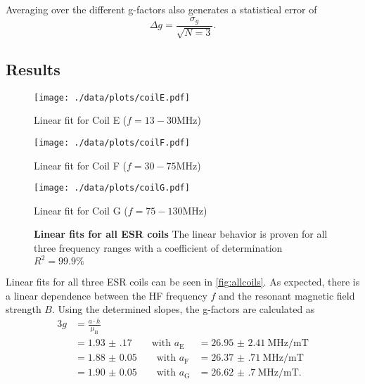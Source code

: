 Averaging over the different g-factors also generates a statistical error of
\begin{equation*}
	\Delta g = \frac{\sigma_g}{\sqrt{N=3}}.
\end{equation*}

\subsection{Results}
\begin{figure}[!htb]
		\texttt{[image: ./data/plots/coilE.pdf]}
		\caption*{Linear fit for Coil E ($f=13-30\si{\MHz}$)}\label{fig:coilE}
	\endminipage\hfill
	\texttt{[image: ./data/plots/coilF.pdf]}
	\caption*{Linear fit for Coil F ($f=30-75\si{\MHz}$)}\label{fig:coilF}
	\endminipage\hfill\centering
	\texttt{[image: ./data/plots/coilG.pdf]}
	\caption*{Linear fit for Coil G ($f=75-130\si{\MHz}$)}\label{fig:coilG}
	\endminipage
	\caption[Linear fits for all ESR coils]{\textbf{Linear fits for all ESR coils} The linear behavior is proven for all three frequency ranges with a coefficient of determination $R^2=\num{99.9}\%$}
	\label{fig:allcoils}
\end{figure}

Linear fits for all three ESR coils can be seen in \autoref{fig:allcoils}.
As expected, there is a linear dependence between the HF frequency $f$ and the resonant magnetic field strength $B$.
Using the determined slopes, the g-factors are calculated as
\begin{alignat*}{3}
	g &= \frac{a\cdot h}{\mu_\text{B}} \\
	&= \num{1.93(17)}\qquad\text{with } a_\text{E}&=\SI{26.95(241)}{\MHz\per\milli\tesla} \\
	&= \num{1.88(5)}\qquad\text{with } a_\text{F}&=\SI{26.37(71)}{\MHz\per\milli\tesla} \\
	&= \num{1.90(5)}\qquad\text{with } a_\text{G}&=\SI{26.62(70)}{\MHz\per\milli\tesla}.
\end{alignat*}
